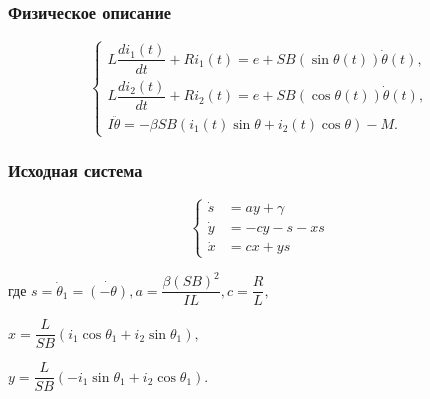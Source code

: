\documentclass[14pt]{beamer}
\begin{document}
\begin{frame}
\begin{figure}[H]
\begin{center}
\begin{minipage}[h]{0.4\linewidth}
  \end{minipage}    
    
  \end{center}
\end{figure}


\end{frame}


\begin{frame}

\frametitle{Физическое описание}
$$
        \left\{
                \begin{aligned}
                        L \dfrac{di_1(t)}{dt} + Ri_1(t) = e + SB(\sin\theta(t)) \dot \theta (t), \\
                        L \dfrac{di_2(t)}{dt} + Ri_2(t) = e + SB(\cos\theta(t)) \dot \theta (t),
\\
  						I \ddot \theta = -\beta SB(i_1(t)\sin\theta + i_2(t)\cos\theta) - M.
                \end{aligned}
        \right.
$$
\end{frame}


\begin{frame}

\frametitle{Исходная система}
$$
        \left\{
                \begin{aligned}
                        \dot s &= ay + \gamma \\
                        \dot y &= -cy -s -xs \\
                        \dot x &= cx + ys
                \end{aligned}
        \right. 
$$

\vspace{10pt}

\small{

где $ s = \dot \theta_1 = \dot{(-\theta)}, a = \dfrac{\beta(SB)^2}{IL}, c = \dfrac{R}{L}, $

\hspace{15pt} $ x = \dfrac{L}{SB} (i_1\cos\theta_1 + i_2\sin\theta_1),$

\vspace{5pt}

\hspace{15pt} $ y = \dfrac{L}{SB} (-i_1\sin\theta_1 + i_2\cos\theta_1).$
}

\end{frame}
\end{document}
